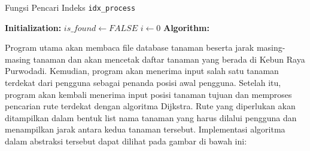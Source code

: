 \documentclass[conference]{IEEEtran}
\begin{document}
\begin{algorithm}
    \caption{Fungsi Pencari Indeks \texttt{idx\_process}}\label{alg:three}
    \DontPrintSemicolon
    \textbf{Initialization:}\;
    $is\_found \gets FALSE$\;
    $i \gets 0$\;
    \textbf{Algorithm:}\;
\end{algorithm}

Program utama akan membaca file database tanaman
beserta jarak masing-masing tanaman dan akan mencetak
daftar tanaman yang berada di Kebun Raya Purwodadi.
Kemudian, program akan menerima input salah satu tanaman
terdekat dari pengguna sebagai penanda posisi awal pengguna.
Setelah itu, program akan kembali menerima input posisi
tanaman tujuan dan memproses pencarian rute terdekat dengan
algoritma Dijkstra. Rute yang diperlukan akan ditampilkan
dalam bentuk list nama tanaman yang harus dilalui pengguna
dan menampilkan jarak antara kedua tanaman tersebut.
Implementasi algoritma dalam abstraksi tersebut dapat dilihat
pada gambar di bawah ini:
\end{document}
